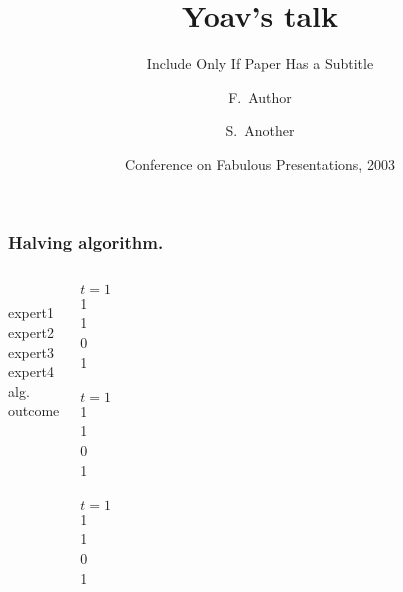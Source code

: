 \documentclass{beamer}
\title[Yoav] %
{Yoav's talk}
\subtitle
{Include Only If Paper Has a Subtitle}
\author[yfreund] %
{F.~Author\inst{1} \and S.~Another\inst{2}}
\institute[Universities of Somewhere and Elsewhere] %
{
  \inst{1}%
  Department of Computer Science\\
  University of Somewhere
  \and
  \inst{2}%
  Department of Theoretical Philosophy\\
  University of Elsewhere}
\date[CFP 2003] %
{Conference on Fabulous Presentations, 2003}
\begin{document}
\begin{frame} 
\frametitle{Halving algorithm.} 
\begin{columns} 
\column[t]{3cm}
\\
expert1\\ expert2\\ expert3\\ expert4 \\ 
\pause
alg. \\
\pause
outcome 

\pause
\column[t]{1cm}
$t=1$ \\
1 \\ 1 \\ 0  \\ 1 \\
 \\
\pause
\column[t]{1cm}
$t=1$ \\
1 \\ 1 \\ 0  \\ 1 \\
 \\
\pause
\column[t]{1cm}
$t=1$ \\
1 \\ 1 \\ 0  \\ 1 \\
 \\
\end{columns} 
\end{frame} 
\end{document}
